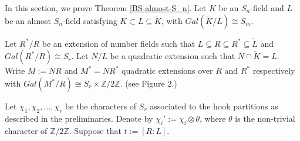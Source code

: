 \documentclass[12pt]{amsart}
\theoremstyle{definition}
\newcommand{\Z}{\mathbb{Z}}
\begin{document}
% 






In this section, we prove Theorem \ref{BS-almost-S_n}. Let $K$ be an $S_n$-field and $L$ be an almost $S_n$-field satisfying $K\subset L \subseteq \widetilde{K}$, with $Gal(\widetilde{K}/L) \cong S_m$.
\smallskip

Let $R^*/R$ be an extension of number fields such that $L \subseteq R \subseteq R^*\subseteq \widetilde{L}$ and $Gal(R^*/R)\cong S_r$. Let $N/L$ be a quadratic extension such that $N\cap \widetilde{K} = L$. Write $M:= NR$ and $M^* = N R^*$ quadratic extensions over $R$ and $R^*$ respectively with $Gal(M^*/R)\cong S_r \times \Z/2\Z$. (see Figure 2.)
\medskip

Let $\chi_1,\chi_2,\ldots, \chi_r$ be the characters of $S_r$ associated to the hook partitions as described in the preliminaries. Denote by $\chi_i' := \chi_i\otimes \theta$, where $\theta$ is the non-trivial character of $\Z/2\Z$. Suppose that $t:=[R:L]$.
\end{document}
